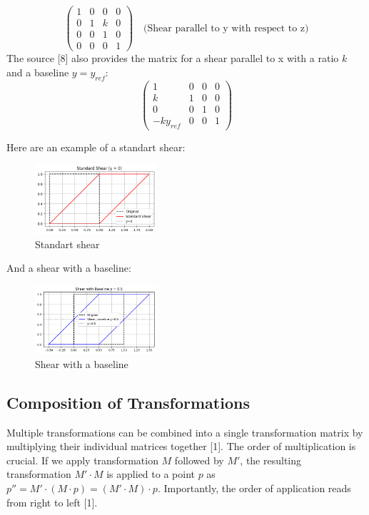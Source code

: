 \documentclass[12pt]{article}
\begin{document}
\begin{itemize}
    \[
    \begin{pmatrix} 1 & 0 & 0 & 0 \\ 0 & 1 & k & 0 \\ 0 & 0 & 1 & 0 \\ 0 & 0 & 0 & 1 \end{pmatrix} \quad \text{(Shear parallel to y with respect to z)}
    \]
    The source [8] also provides the matrix for a shear parallel to x with a ratio $k$ and a baseline $y = y_{ref}$:
    \[
    \begin{pmatrix} 1 & 0 & 0 & 0 \\ k & 1 & 0 & 0 \\ 0 & 0 & 1 & 0 \\ -k y_{ref} & 0 & 0 & 1 \end{pmatrix}
    \]

    Here are an example of a standart shear:
    \begin{figure}[H]
        \centering
        \includegraphics[width=0.4\textwidth]{figures/standart_shear.png}
        \caption{Standart shear}
        \label{fig:standart_shear}
    \end{figure}

    And a shear with a baseline:
    \begin{figure}[H]
        \centering
        \includegraphics[width=0.4\textwidth]{figures/shear_with_baseline.png}
        \caption{Shear with a baseline}
        \label{fig:baseline_shear}
    \end{figure}
\end{itemize}

\subsection{Composition of Transformations}

Multiple transformations can be combined into a single transformation matrix by multiplying their individual matrices together [1]. The order of multiplication is crucial. If we apply transformation $M$ followed by $M'$, the resulting transformation $M' \cdot M$ is applied to a point $p$ as $p'' = M' \cdot (M \cdot p) = (M' \cdot M) \cdot p$. Importantly, the order of application reads from right to left [1].
\end{document}
